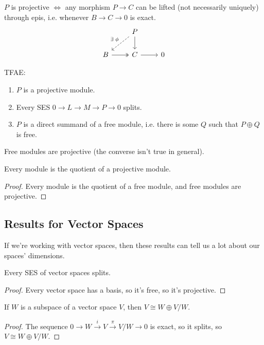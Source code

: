 \documentclass[twoside,10pt]{report}
\begin{document}
\begin{prop}
	$P$ is projective $\iff$ any morphism $P\to C$ can be lifted (not necessarily uniquely) through epis, i.e. whenever $B\to C\to 0$ is exact.
\[
\begin{tikzcd}
	& P \arrow[dl, dashed, "\exists\;\phi"'] \dar \\
	B \rar[two heads] & C \rar & 0
\end{tikzcd}
\] 
\end{prop}

\begin{thrm}[]
	TFAE:
	\begin{enumerate}
		\item $P$ is a projective module.
		\item Every SES $0\to L\to M\to P\to 0$ splits.
		\item $P$ is a direct summand of a free module, i.e. there is some $Q$ such that $P \oplus Q$ is free.
	\end{enumerate}
\end{thrm}

\begin{cor}
	Free modules are projective (the converse isn't true in general).
\end{cor}


\begin{cor}
Every module is the quotient of a projective module.
\end{cor}
\begin{proof}
	Every module is the quotient of a free module, and free modules are projective.
\end{proof}

\subsection{Results for Vector Spaces}

If we're working with vector spaces, then these results can tell us a lot about our spaces' dimensions.

\begin{prop}
Every SES of vector spaces splits.
\end{prop}
\begin{proof}
	Every vector space has a basis, so it's free, so it's projective.
\end{proof}

\begin{cor}
	If $W$ is a subspace of a vector space $V$, then $V \cong W \oplus V/W$.
\end{cor}
\begin{proof}
	The sequence $0\to W\stackrel{i}{\to } V\stackrel{\pi}{\to } V/W\to 0$ is exact, so it splits, so $V \cong W \oplus V/W$.
\end{proof}
\end{document}
